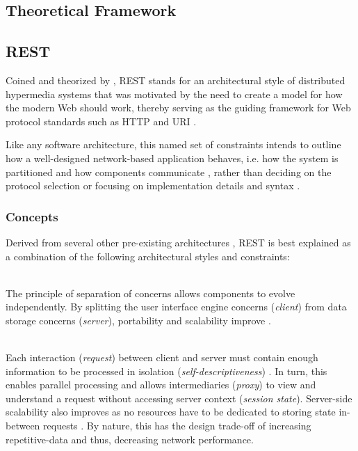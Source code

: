 
\begin{appendices}

\chapter{Theoretical Framework}
\label{app:theoretical-framework}

\section{\acl{REST}}
\label{sec:rest}

Coined and theorized by \citeauthor{fielding2000architectural}, \ac{REST} stands for an architectural style of distributed hypermedia systems that was motivated by the need to create a model for how the modern Web should work, thereby serving as the guiding framework for Web protocol standards such as \acs{HTTP} and \acs{URI} \cite[pp.~76,~107]{fielding2000architectural}.

Like any software architecture, this named set of constraints intends to outline how a well-designed network-based application behaves, i.e. how the system is partitioned and how components communicate \cite[p.~xvi]{fielding2000architectural}, rather than deciding on the protocol selection or focusing on implementation details and syntax \cite[pp.~86,~109]{fielding2000architectural}.


\subsection{Concepts}
\label{sec:rest-concepts}

Derived from several other pre-existing architectures \cite[p.~76]{fielding2000architectural}, \ac{REST} is best explained as a combination of the following architectural styles and constraints:

\begin{description}[format={\storedescriptionlabel}]
	\item[Client-server]
	\hfill \\
	The principle of separation of concerns allows components to evolve independently. By splitting the user interface engine concerns (\textit{client}) from data storage concerns (\textit{server}), portability and scalability improve \cite[p.~78]{fielding2000architectural}.

	\item[Stateless]
	\hfill \\
	Each interaction (\textit{request}) between client and server must contain enough information to be processed in isolation (\textit{self-descriptiveness}) \cite[pp.~78--79]{fielding2000architectural}. In turn, this enables parallel processing and allows intermediaries (\textit{proxy}) to view and understand a request without accessing server context (\textit{session state}). Server-side scalability also improves as no resources have to be dedicated to storing state in-between requests \cite[pp.~79, 93]{fielding2000architectural}. By nature, this has the design trade-off of increasing repetitive-data and thus, decreasing network performance.


\end{description}
\end{appendices}
